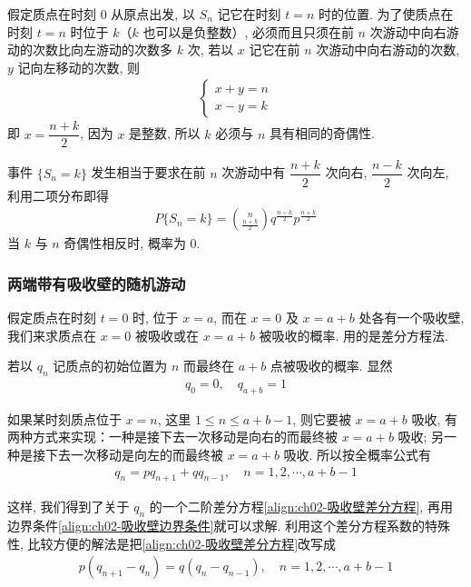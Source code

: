 \documentclass[../../main.tex]{subfiles}
\begin{document}
假定质点在时刻 $0$ 从原点出发, 以 $S_n$ 记它在时刻 $t=n$ 时的位置. 为了使质点在时刻 $t=n$ 时位于 $k$（$k$ 也可以是负整数）, 必须而且只须在前 $n$ 次游动中向右游动的次数比向左游动的次数多 $k$ 次, 若以 $x$ 记它在前 $n$ 次游动中向右游动的次数, $y$ 记向左移动的次数, 则
\begin{align*}
\begin{cases}
x+y=n\\
x-y=k
\end{cases}
\end{align*}
即 $x=\dfrac{n+k}{2}$, 因为 $x$ 是整数, 所以 $k$ 必须与 $n$ 具有相同的奇偶性.

事件 $\{S_n=k\}$ 发生相当于要求在前 $n$ 次游动中有 $\dfrac{n+k}{2}$ 次向右, $\dfrac{n-k}{2}$ 次向左, 利用二项分布即得
\begin{align*}
P\{S_n=k\}=\binom{n}{\frac{n+k}{2}}q^{\frac{n-k}{2}}p^{\frac{n+k}{2}}
\end{align*}
当 $k$ 与 $n$ 奇偶性相反时, 概率为 $0$.

\subsubsection{两端带有吸收壁的随机游动}

假定质点在时刻 $t=0$ 时, 位于 $x=a$, 而在 $x=0$ 及 $x=a+b$ 处各有一个吸收壁, 我们来求质点在 $x=0$ 被吸收或在 $x=a+b$ 被吸收的概率. 用的是差分方程法.

若以 $q_n$ 记质点的初始位置为 $n$ 而最终在 $a+b$ 点被吸收的概率. 显然
\begin{align}\label{align:ch02-吸收壁边界条件}
q_0=0,\quad q_{a+b}=1
\end{align}

如果某时刻质点位于 $x=n$, 这里 $1\leqslant n\leqslant a+b-1$, 则它要被 $x=a+b$ 吸收, 有两种方式来实现：一种是接下去一次移动是向右的而最终被 $x=a+b$ 吸收; 另一种是接下去一次移动是向左的而最终被 $x=a+b$ 吸收. 所以按全概率公式有
\begin{align}\label{align:ch02-吸收壁差分方程}
q_n=pq_{n+1}+qq_{n-1},\quad n=1,2,\cdots,a+b-1
\end{align}

这样, 我们得到了关于 $q_n$ 的一个二阶差分方程\eqref{align:ch02-吸收壁差分方程}, 再用边界条件\eqref{align:ch02-吸收壁边界条件}就可以求解. 利用这个差分方程系数的特殊性, 比较方便的解法是把\eqref{align:ch02-吸收壁差分方程}改写成
\begin{align*}
p(q_{n+1}-q_n)=q(q_n-q_{n-1}),\quad n=1,2,\cdots,a+b-1
\end{align*}
\end{document}
